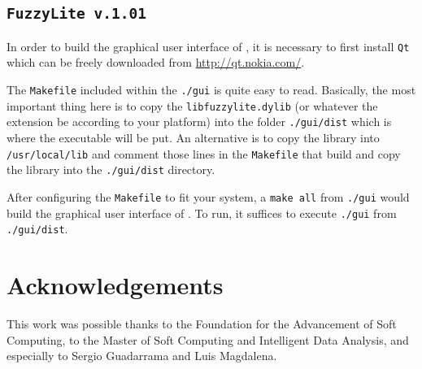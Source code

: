 	\subsection{\texttt{FuzzyLite v.1.01}}
In order to build the graphical user interface of \fl, it is necessary to first
install \texttt{Qt} which can be freely downloaded from
\url{http://qt.nokia.com/}.
	
The \texttt{Makefile} included within the \texttt{./gui} is quite easy to read.
Basically, the most important thing here is to copy the
\texttt{libfuzzylite.dylib} (or whatever the extension be according to your
platform) into the folder \texttt{./gui/dist} which is where the executable will
be put. An alternative is to copy the library into \texttt{/usr/local/lib} and
comment those lines in the \texttt{Makefile} that build and copy the library
into the \texttt{./gui/dist} directory.
	
After configuring the \texttt{Makefile} to fit your system, a \texttt{make all}
from \texttt{./gui} would build the graphical user interface of \fl. To run, it
suffices to execute \texttt{./gui} from \texttt{./gui/dist}.
	
	\section{Acknowledgements}
This work was possible thanks to the Foundation for the Advancement of Soft
Computing, to the Master of Soft Computing and Intelligent Data Analysis, and
especially to Sergio Guadarrama and Luis Magdalena.

